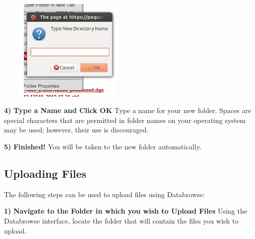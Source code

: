 \documentclass[10pt]{article}
\begin{document}
\endgroup

\hfill \break
\hfill \break
\hfill \break
\hfill \break
\hfill \break
\hfill \break
\hfill \break
\hfill \break
\hfill \break
\hfill \break
\hfill \break

\begingroup
\setlength\intextsep{0pt}
\begin{figure}
		\includegraphics[width=1.9339in]{ContextMenu3.png}
\end{figure}
\noindent\textbf{4)} \textbf{Type a Name and Click OK} \newline Type a name for your new folder.  Spaces are special characters that are permitted in folder names on your operating system may be used; however, their use is discouraged.

\endgroup

\hfill \break
\hfill \break
\hfill \break
\hfill \break
\hfill \break
\hfill \break
\hfill \break
\hfill \break

\noindent\textbf{5)} \textbf{Finished!} \newline You will be taken to the new folder automatically.

\clearpage
\subsection{Uploading Files}

The following steps can be used to upload files using Databrowse:

\begin{changemargin}{0in}{150.4pt}
\noindent\textbf{1)} \textbf{Navigate to the Folder in which you wish to Upload Files} \newline Using the Databrowse interface, locate the folder that will contain the files you wish to upload.
\end{changemargin}
\end{document}
